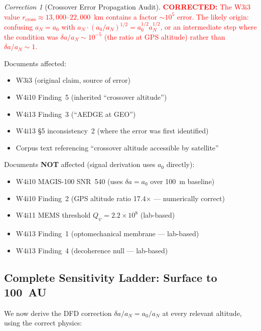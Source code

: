 \documentclass[11pt]{article}
\theoremstyle{definition}
\theoremstyle{remark}
\newtheorem{correction}[theorem]{Correction}
\newcommand{\ee}[1]{\times10^{#1}}
\newcommand{\Qpsi}{Q_\psi}
\newcommand{\azero}{a_0}
\newcommand{\corrected}[1]{\textcolor{red}{\textbf{CORRECTED:} #1}}
\begin{document}
\begin{correction}[Crossover Error Propagation Audit]
\label{cor:crossover-audit}
\corrected{The W3i3 value $r_{\mathrm{cross}} \approx 13{,}000$--$22{,}000$~km
contains a factor $\sim 10^5$ error. The likely origin: confusing
$a_N = \azero$ with $a_N \cdot (\azero / a_N)^{1/2} = \azero^{1/2} a_N^{1/2}$,
or an intermediate step where the condition was $\delta a / a_N \sim 10^{-5}$
(the ratio at GPS altitude) rather than $\delta a / a_N \sim 1$.}

Documents affected:
\begin{itemize}[nosep]
\item W3i3 (original claim, source of error)
\item W4i10 Finding~5 (inherited ``crossover altitude'')
\item W4i13 Finding~3 (``AEDGE at GEO'')
\item W4i13 \S5 inconsistency~2 (where the error was first identified)
\item Corpus text referencing ``crossover altitude accessible by satellite''
\end{itemize}

Documents \textbf{NOT} affected (signal derivation uses $\azero$ directly):
\begin{itemize}[nosep]
\item W4i10 MAGIS-100 SNR~540 (uses $\delta a = \azero$ over 100~m baseline)
\item W4i10 Finding~2 (GPS altitude ratio 17.4$\times$ --- numerically correct)
\item W4i11 MEMS threshold $\Qpsi = 2.2\ee{8}$ (lab-based)
\item W4i13 Finding~1 (optomechanical membrane --- lab-based)
\item W4i13 Finding~4 (decoherence null --- lab-based)
\end{itemize}
\end{correction}

\subsection{Complete Sensitivity Ladder: Surface to 100~AU}

We now derive the DFD correction $\delta a / a_N = \azero / a_N$
at every relevant altitude, using the correct physics:
\end{document}
